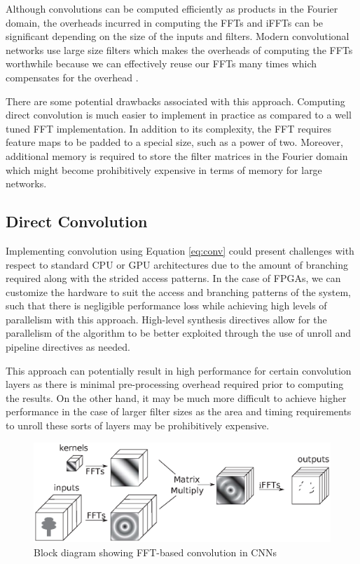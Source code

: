 \documentclass[conference,compsoc]{IEEEtran/IEEEtran}
\begin{document}
Although convolutions can be computed efficiently as products in the Fourier domain, the overheads incurred in computing the FFTs and iFFTs can be significant depending on the size of the inputs and filters. Modern convolutional networks use large size filters which makes the overheads of computing the FFTs worthwhile because we can effectively reuse our FFTs many times which compensates for the overhead \cite{FFT1}.

There are some potential drawbacks associated with this approach. Computing direct convolution is much easier to implement in practice as compared to a well tuned FFT implementation. In addition to its complexity, the FFT requires feature maps to be padded to a special size, such as a power of two. Moreover, additional memory is required to store the filter matrices in the Fourier domain which might become prohibitively expensive in terms of memory for large networks.

\subsection{Direct Convolution} 

Implementing convolution using Equation \ref{eq:conv} could present challenges with respect to standard CPU or GPU architectures
due to the amount of branching required along with the strided access patterns. In the case of FPGAs, we can customize the hardware 
to suit the access and branching patterns of the system, such that there is negligible performance loss while achieving high
levels of parallelism with this approach. High-level synthesis directives allow for the parallelism of the algorithm to be better
exploited through the use of unroll and pipeline directives as needed. 

This approach can potentially result in high performance for certain convolution layers as there is minimal pre-processing overhead
required prior to computing the results. On the other hand, it may be much more difficult to achieve higher performance in the case of
larger filter sizes as the area and timing requirements to unroll these sorts of layers may be prohibitively expensive. 

\begin{figure}[!h]
\begin{center}
\centering
\includegraphics[width=1\columnwidth]{CNN-FFT.eps}
\caption{Block diagram showing FFT-based convolution in CNNs}
\label{CNN-FFT}
\end{center}
\end{figure}
\end{document}
